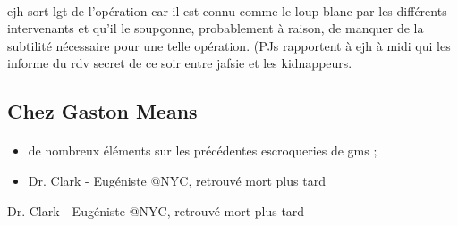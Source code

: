 \paragraph{} \gls{ejh} sort \gls{lgt} de l'opération car il est connu comme le loup blanc par les différents intervenants et 
qu'il le soupçonne, probablement à raison, de manquer de la subtilité nécessaire pour une telle opération. (PJs rapportent à 
\gls{ejh} à midi qui les informe du rdv secret de ce soir entre \gls{jafsie} et les kidnappeurs.

\subsection{Chez Gaston Means}

\paragraph{}
\begin{itemize}
 \item de nombreux éléments sur les précédentes escroqueries de \gls{gms} ;
 \item Dr. Clark - Eugéniste @NYC, retrouvé mort plus tard
\end{itemize}

Dr. Clark - Eugéniste @NYC, retrouvé mort plus tard



